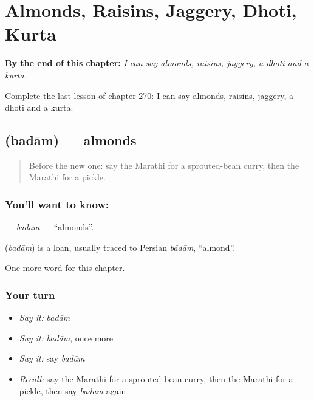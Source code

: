 
\chapter{Almonds, Raisins, Jaggery, Dhoti, Kurta}
\label{ch:mr-almonds-raisins-jaggery-dhoti-kurta}

\begin{chapteropening}
\textbf{By the end of this chapter:} \emph{I can say almonds, raisins, jaggery, a dhoti and a kurta.}

Complete the last lesson of chapter 270: I can say almonds, raisins, jaggery, a dhoti and a kurta.
\end{chapteropening}

\section[\texorpdfstring{\mr{बदाम} (badām)}{बदाम (badām)}]{ (badām) — almonds}

\label{lesson:MR-C270-badam}



\begin{quote}
Before the new one: say the Marathi for a sprouted-bean curry, then the Marathi for a pickle.
\end{quote}

\subsection*{You'll want to know: }
\textbf{} — \emph{badām} — \textquotedblleft{}almonds\textquotedblright{}.

\begin{cousinweb}
\textbf{} (\emph{badām}) is a loan, usually traced to Persian \emph{bādām}, \textquotedblleft{}almond\textquotedblright{}.
\end{cousinweb}

\begin{grammarlens}[title={What you've built}]
One more word for this chapter.
\end{grammarlens}

\subsection*{Your turn}
\begin{itemize}
\raggedright
  \item \emph{Say it:} \emph{badām}
  \item \emph{Say it:} \emph{badām}, once more
  \item \emph{Say it:} say \emph{badām}
  \item \emph{Recall:} say the Marathi for a sprouted-bean curry, then the Marathi for a pickle, then say \emph{badām} again
\end{itemize}

